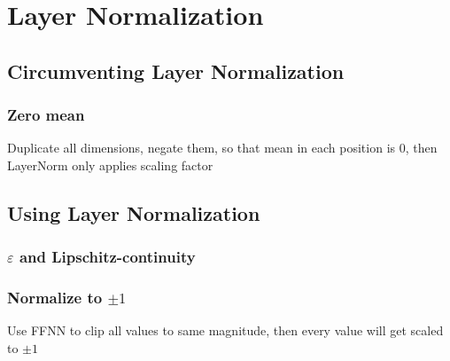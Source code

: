 \chapter{Layer Normalization}

\section{Circumventing Layer Normalization}

\subsection{Zero mean}

Duplicate all dimensions, negate them, so that mean in each position is $0$, then LayerNorm only applies scaling factor

\section{Using Layer Normalization}

\subsection{$\varepsilon$ and Lipschitz-continuity}

\subsection{Normalize to $\pm1$}

Use FFNN to clip all values to same magnitude, then every value will get scaled to $\pm 1$